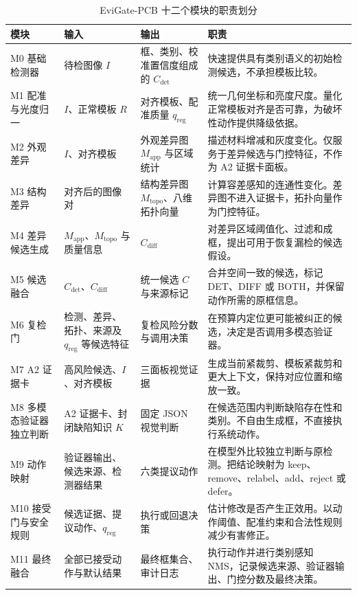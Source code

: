 \begin{table}[t]
  \centering
  \caption{EviGate-PCB 十二个模块的职责划分}
  \label{tab:modules}
  \small
  \setlength{\tabcolsep}{4pt}
  \begin{tabular}{@{}p{}p{}p{}p{}@{}}
    \toprule
    模块 & 输入 & 输出 & 职责 \\
    \midrule
    M0 基础检测器 & 待检图像 $I$ & 框、类别、校准置信度组成的 $C_{\mathrm{det}}$ & 快速提供具有类别语义的初始检测候选，不承担模板比较。 \\
    M1 配准与光度归一 & $I$、正常模板 $R$ & 对齐模板、配准质量 $q_{\mathrm{reg}}$ & 统一几何坐标和亮度尺度。量化正常模板对齐是否可靠，为破坏性动作提供降级依据。 \\
    M2 外观差异 & $I$、对齐模板 & 外观差异图 $M_{\mathrm{app}}$ 与区域统计 & 描述材料增减和灰度变化。仅服务于差异候选与门控特征，不作为 A2 证据卡面板。 \\
    M3 结构差异 & 对齐后的图像对 & 结构差异图 $M_{\mathrm{topo}}$、八维拓扑向量 & 计算容差感知的连通性变化。差异图不进入证据卡，拓扑向量作为门控特征。 \\
    M4 差异候选生成 & $M_{\mathrm{app}}$、$M_{\mathrm{topo}}$ 与质量信息 & $C_{\mathrm{diff}}$ & 对差异区域阈值化、过滤和成框，提出可用于恢复漏检的候选假设。 \\
    M5 候选融合 & $C_{\mathrm{det}}$、$C_{\mathrm{diff}}$ & 统一候选 $C$ 与来源标记 & 合并空间一致的候选，标记 DET、DIFF 或 BOTH，并保留动作所需的原框信息。 \\
    M6 复检门 & 检测、差异、拓扑、来源及 $q_{\mathrm{reg}}$ 等候选特征 & 复检风险分数与调用决策 & 在预算内定位更可能被纠正的候选，决定是否调用多模态验证器。 \\
    M7 A2 证据卡 & 高风险候选、$I$、对齐模板 & 三面板视觉证据 & 生成当前紧裁剪、模板紧裁剪和更大上下文，保持对应位置和缩放一致。 \\
    M8 多模态验证器独立判断 & A2 证据卡、封闭缺陷知识 $K$ & 固定 JSON 视觉判断 & 在候选范围内判断缺陷存在性和类别。不自由生成框，不直接执行系统动作。 \\
    M9 动作映射 & 验证器输出、候选来源、检测器结果 & 六类提议动作 & 在模型外比较独立判断与原检测。把结论映射为 keep、remove、relabel、add、reject 或 defer。 \\
    M10 接受门与安全规则 & 候选证据、提议动作、$q_{\mathrm{reg}}$ & 执行或回退决策 & 估计修改是否产生正效用。以动作阈值、配准约束和合法性规则减少有害修正。 \\
    M11 最终融合 & 全部已接受动作与默认结果 & 最终框集合、审计日志 & 执行动作并进行类别感知 NMS，记录候选来源、验证器输出、门控分数及最终决策。 \\
    \bottomrule
  \end{tabular}
\end{table}

